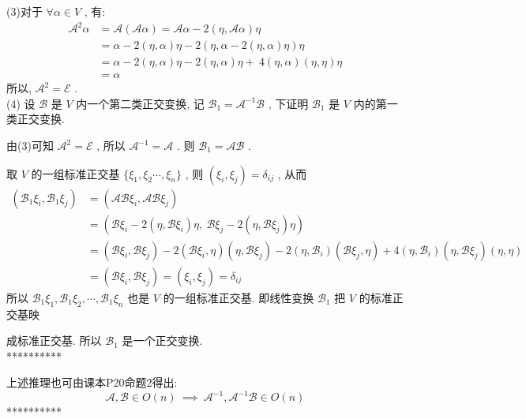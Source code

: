 \documentclass[11pt,a4paper,openany,oneside]{book}
\begin{document}
(3)对于 $ \forall \alpha \in V $ , 有:
\begin{align*}
\mathcal{A}^2\alpha &= \mathcal{A}(\mathcal{A}\alpha) = \mathcal{A}\alpha - 2(\eta, \mathcal{A}\alpha)\eta \\
&= \alpha - 2(\eta, \alpha)\eta - 2(\eta, \alpha-2(\eta,\alpha)\eta)\eta \\
&= \alpha - 2(\eta, \alpha)\eta - 2(\eta, \alpha)\eta +\ 4(\eta, \alpha)(\eta, \eta)\eta \\ 
&= \alpha
\end{align*}
所以,  $ \mathcal{A}^2 = \mathcal{E} $ . \\

(4) 设 $ \mathcal{B} $ 是 $ V $ 内一个第二类正交变换, 记 $ \mathcal{B}_1 = \mathcal{A}^{-1}\mathcal{B} $ , 下证明 $ \mathcal{B}_1 $ 是 $ V $ 内的第一类正交变换.

\hspace{1em} 由(3)可知 $ \mathcal{A}^2 = \mathcal{E} $ , 所以 $ \mathcal{A}^{-1}=\mathcal{A} $ . 则 $ \mathcal{B}_1 = \mathcal{A}\mathcal{B} $ . 

\hspace{1em} 取 $ V $ 的一组标准正交基 $ \{\xi_1, \xi_2 \cdots, \xi_n \} $ , 则 $ (\xi_i, \xi_j) = \delta_{ij} $ , 从而
\begin{align*}
(\mathcal{B}_1\xi_i, \mathcal{B}_1\xi_j) &= (\mathcal{A}\mathcal{B}\xi_i, \mathcal{A}\mathcal{B}\xi_j) \\
&=\left(\mathcal{B}\xi_i - 2(\eta, \mathcal{B}\xi_i)\eta,\ \mathcal{B}\xi_j - 2(\eta, \mathcal{B}\xi_j)\eta\right)  \\
&= (\mathcal{B}\xi_i, \mathcal{B}\xi_j) -2(\mathcal{B}\xi_i, \eta)(\eta, \mathcal{B}\xi_j) -2(\eta, \mathcal{B}_i)(\mathcal{B}\xi_j, \eta) + 4(\eta,\mathcal{B}_i)(\eta, \mathcal{B}\xi_j)(\eta, \eta) \\
&= (\mathcal{B}\xi_i, \mathcal{B}\xi_j) = (\xi_i, \xi_j) = \delta_{ij}  
\end{align*}
\hspace{1em} 所以 $ \mathcal{B}_1\xi_1, \mathcal{B}_1\xi_2, \cdots, \mathcal{B}_1\xi_n $ 也是 $ V $ 的一组标准正交基. 即线性变换 $ \mathcal{B}_1 $ 把 $ V $ 的标准正交基映

\hspace{1em} 成标准正交基. 所以 $ \mathcal{B}_1 $ 是一个正交变换. \\

********** 

上述推理也可由课本P20命题2得出:
 $$ \mathcal{A}, \mathcal{B} \in O(n) \ \implies \ \mathcal{A}^{-1}, \mathcal{A}^{-1}\mathcal{B} \in O(n) $$ 
**********  \\ 
\end{document}
